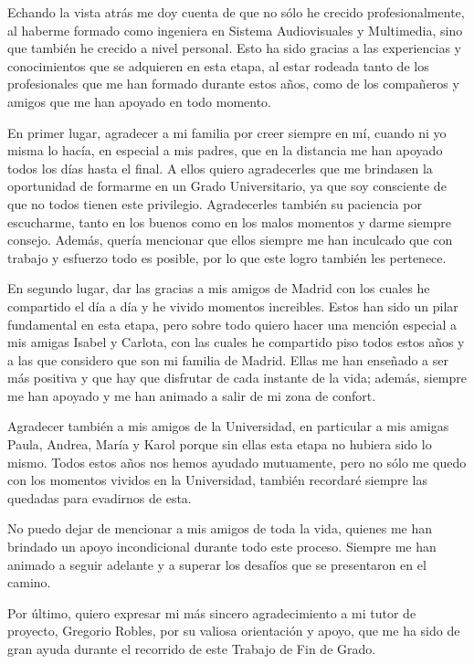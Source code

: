 \documentclass[a4paper, 12pt]{book}
\begin{document}
Echando la vista atrás me doy cuenta de que no sólo he crecido profesionalmente, al haberme formado como ingeniera en Sistema Audiovisuales y Multimedia, sino que también he crecido a nivel personal.
Esto ha sido gracias a las experiencias y conocimientos que se adquieren en esta etapa, al estar rodeada tanto de los profesionales que me han formado durante estos años, como de los compañeros y amigos que me han apoyado en todo momento.


En primer lugar, agradecer a mi familia por creer siempre en mí, cuando ni yo misma lo hacía, en especial a mis padres, que en la distancia me han apoyado todos los días hasta el final.
A ellos quiero agradecerles que me brindasen la oportunidad de formarme en un Grado Universitario, ya que soy consciente de que no todos tienen este privilegio.
Agradecerles también su paciencia por escucharme, tanto en los buenos como en los malos momentos y darme siempre consejo.
Además, quería mencionar que ellos siempre me han inculcado que con trabajo y esfuerzo todo es posible, por lo que este logro también les pertenece.


En segundo lugar, dar las gracias a mis amigos de Madrid con los cuales he compartido el día a día y he vivido momentos increibles. 
Estos han sido un pilar fundamental en esta etapa, pero sobre todo quiero hacer una mención especial a mis amigas Isabel y Carlota, con las cuales he compartido piso todos estos años y a las que considero que son mi familia de Madrid.
Ellas me han enseñado a ser más positiva y que hay que disfrutar de cada instante de la vida; además, siempre me han apoyado y me han animado a salir de mi zona de confort.  


Agradecer también a mis amigos de la Universidad, en particular a mis amigas Paula, Andrea, María y Karol porque sin ellas esta etapa no hubiera sido lo mismo. 
Todos estos años nos hemos ayudado mutuamente, pero no sólo me quedo con los momentos vividos en la Universidad, también recordaré siempre las quedadas para evadirnos de esta. 


No puedo dejar de mencionar a mis amigos de toda la vida, quienes me han brindado un apoyo incondicional durante todo este proceso. 
Siempre me han animado a seguir adelante y a superar los desafíos que se presentaron en el camino.


Por último, quiero expresar mi más sincero agradecimiento a mi tutor de proyecto, Gregorio Robles, por su valiosa orientación y apoyo, que me ha sido de gran ayuda durante el recorrido de este Trabajo de Fin de Grado. 
\end{document}
